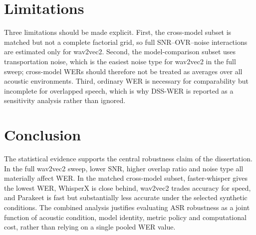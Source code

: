 \section{Limitations}
Three limitations should be made explicit. First, the cross-model subset is matched but not a
complete factorial grid, so full SNR--OVR--noise interactions are estimated only for wav2vec2.
Second, the model-comparison subset uses transportation noise, which is the easiest noise type
for wav2vec2 in the full sweep; cross-model WERs should therefore not be treated as averages over
all acoustic environments. Third, ordinary WER is necessary for comparability but incomplete for
overlapped speech, which is why DSS-WER is reported as a sensitivity analysis rather than
ignored.

\section{Conclusion}
The statistical evidence supports the central robustness claim of the dissertation. In the full
wav2vec2 sweep, lower SNR, higher overlap ratio and noise type all materially affect WER. In the
matched cross-model subset, faster-whisper gives the lowest WER, WhisperX is close behind,
wav2vec2 trades accuracy for speed, and Parakeet is fast but substantially less accurate under
the selected synthetic conditions. The combined analysis justifies evaluating ASR robustness as
a joint function of acoustic condition, model identity, metric policy and computational cost,
rather than relying on a single pooled WER value.
